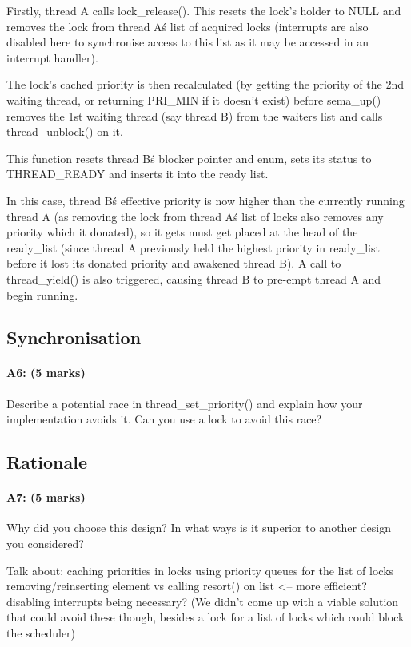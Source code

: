 Firstly, thread A calls lock\_release(). This resets the lock's holder to NULL and removes the lock from thread A\'s list of acquired locks (interrupts are also disabled here to synchronise access to this list as it may be accessed in an interrupt handler).

The lock's cached priority is then recalculated (by getting the priority of the 2nd waiting thread, or returning PRI\_MIN if it doesn't exist) before sema\_up() removes the 1st waiting thread (say thread B) from the waiters list and calls thread\_unblock() on it.

This function resets thread B\'s blocker pointer and enum, sets its status to THREAD\_READY and inserts it into the ready list.

In this case, thread B\'s effective priority is now higher than the currently running thread A (as removing the lock from thread A\'s list of locks also removes any priority which it donated), so it gets must get placed at the head of the ready\_list (since thread A previously held the highest priority in ready\_list before it lost its donated priority and awakened thread B). A call to thread\_yield() is also triggered, causing thread B to pre-empt thread A and begin running.

\subsection{Synchronisation}
\paragraph{A6: (5 marks)}
Describe a potential race in thread\_set\_priority() and explain how your implementation avoids it.  Can you use a lock to avoid this race?



\subsection{Rationale}
\paragraph{A7: (5 marks)}
Why did you choose this design?  In what ways is it superior to another design you considered?

Talk about:
	caching priorities in locks
	using priority queues for the list of locks
  removing/reinserting element vs calling resort() on list <-- more efficient?
	disabling interrupts being necessary? (We didn't come up with a viable solution that could avoid these though, besides a lock for a list of locks which could block the scheduler)
